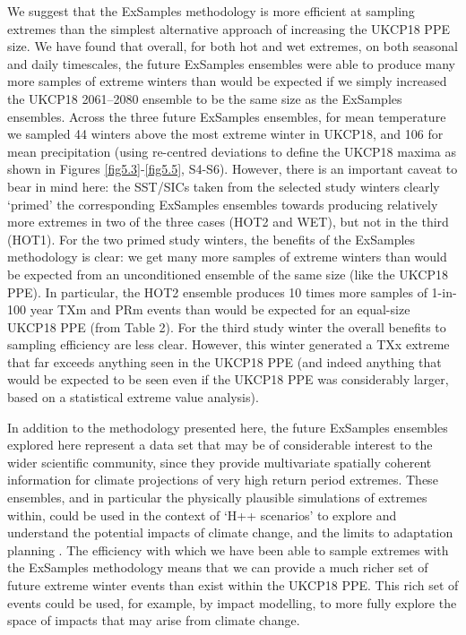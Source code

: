   We suggest that the ExSamples methodology is more efficient at sampling extremes than the simplest alternative approach of increasing the UKCP18 PPE size. We have found that overall, for both hot and wet extremes, on both seasonal and daily timescales, the future ExSamples ensembles were able to produce many more samples of extreme winters than would be expected if we simply increased the UKCP18 2061--2080 ensemble to be the same size as the ExSamples ensembles. Across the three future ExSamples ensembles, for mean temperature we sampled 44 winters above the most extreme winter in UKCP18, and 106 for mean precipitation (using re-centred deviations to define the UKCP18 maxima as shown in Figures \ref{fig5.3}-\ref{fig5.5}, S4-S6). However, there is an important caveat to bear in mind here: the SST/SICs taken from the selected study winters clearly `primed' the corresponding ExSamples ensembles towards producing relatively more extremes in two of the three cases (HOT2 and WET), but not in the third (HOT1). For the two primed study winters, the benefits of the ExSamples methodology is clear: we get many more samples of extreme winters than would be expected from an unconditioned ensemble of the same size (like the UKCP18 PPE). In particular, the HOT2 ensemble produces 10 times more samples of 1-in-100 year TXm and PRm events than would be expected for an equal-size UKCP18 PPE (from Table 2). For the third study winter the overall benefits to sampling efficiency are less clear. However, this winter generated a TXx extreme that far exceeds anything seen in the UKCP18 PPE (and indeed anything that would be expected to be seen even if the UKCP18 PPE was considerably larger, based on a statistical extreme value analysis).
  
  In addition to the methodology presented here, the future ExSamples ensembles explored here represent a data set that may be of considerable interest to the wider scientific community, since they provide multivariate spatially coherent information for climate projections of very high return period extremes. These ensembles, and in particular the physically plausible simulations of extremes within, could be used in the context of `H++ scenarios' to explore and understand the potential impacts of climate change, and the limits to adaptation planning \citep{wade_developing_2015}. The efficiency with which we have been able to sample extremes with the ExSamples methodology means that we can provide a much richer set of future extreme winter events than exist within the UKCP18 PPE. This rich set of events could be used, for example, by impact modelling, to more fully explore the space of impacts that may arise from climate change.
  

